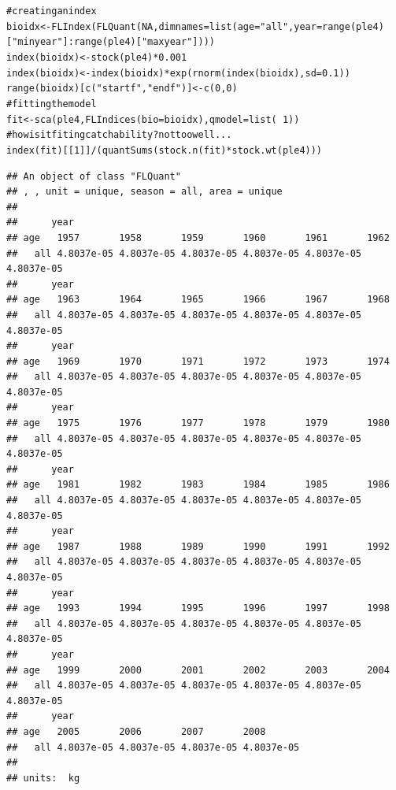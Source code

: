 \documentclass[a4paper,english,10pt]{article}\usepackage[]{graphicx}\usepackage[]{color}
\makeatletter
\newcommand{\hlnum}[1]{\textcolor[rgb]{0.2,0.2,0.2}{#1}}%
\newcommand{\hlstr}[1]{\textcolor[rgb]{0.2,0.2,0.2}{#1}}%
\newcommand{\hlcom}[1]{\textcolor[rgb]{0.2,0.267,0.4}{#1}}%
\newcommand{\hlopt}[1]{\textcolor[rgb]{0.2,0.2,0.2}{#1}}%
\newcommand{\hlstd}[1]{\textcolor[rgb]{0,0,0}{#1}}%
\newcommand{\hlkwb}[1]{\textcolor[rgb]{0.361,0.506,0.596}{#1}}%
\newcommand{\hlkwc}[1]{\textcolor[rgb]{0.361,0.506,0.596}{#1}}%
\newcommand{\hlkwd}[1]{\textcolor[rgb]{0.361,0.506,0.596}{#1}}%
\newenvironment{kframe}{%
 \def\at@end@of@kframe{}%
 \ifinner\ifhmode%
  \def\at@end@of@kframe{\end{minipage}}%
  \begin{minipage}{\columnwidth}%
 \fi\fi%
 \def\FrameCommand##1{\hskip\@totalleftmargin \hskip-\fboxsep
 \colorbox{shadecolor}{##1}\hskip-\fboxsep
     \hskip-\linewidth \hskip-\@totalleftmargin \hskip\columnwidth}%
 \MakeFramed {\advance\hsize-\width
   \@totalleftmargin\z@ \linewidth\hsize
   \@setminipage}}%
 {\par\unskip\endMakeFramed%
 \at@end@of@kframe}
\newenvironment{knitrout}{}{} %
\makeatother
\begin{document}
\begin{knitrout}
\color{fgcolor}\begin{kframe}
\begin{alltt}
\hlcom{# creating an index}
\hlstd{bioidx} \hlkwb{<-} \hlkwd{FLIndex}\hlstd{(}\hlkwd{FLQuant}\hlstd{(}\hlnum{NA}\hlstd{,} \hlkwc{dimnames} \hlstd{=} \hlkwd{list}\hlstd{(}\hlkwc{age} \hlstd{=} \hlstr{"all"}\hlstd{,} \hlkwc{year} \hlstd{=} \hlkwd{range}\hlstd{(ple4)[}\hlstr{"minyear"}\hlstd{]}\hlopt{:}\hlkwd{range}\hlstd{(ple4)[}\hlstr{"maxyear"}\hlstd{])))}
\hlkwd{index}\hlstd{(bioidx)} \hlkwb{<-} \hlkwd{stock}\hlstd{(ple4)} \hlopt{*} \hlnum{0.001}
\hlkwd{index}\hlstd{(bioidx)} \hlkwb{<-} \hlkwd{index}\hlstd{(bioidx)} \hlopt{*} \hlkwd{exp}\hlstd{(}\hlkwd{rnorm}\hlstd{(}\hlkwd{index}\hlstd{(bioidx),} \hlkwc{sd} \hlstd{=} \hlnum{0.1}\hlstd{))}
\hlkwd{range}\hlstd{(bioidx)[}\hlkwd{c}\hlstd{(}\hlstr{"startf"}\hlstd{,} \hlstr{"endf"}\hlstd{)]} \hlkwb{<-} \hlkwd{c}\hlstd{(}\hlnum{0}\hlstd{,} \hlnum{0}\hlstd{)}
\hlcom{# fitting the model}
\hlstd{fit} \hlkwb{<-} \hlkwd{sca}\hlstd{(ple4,} \hlkwd{FLIndices}\hlstd{(}\hlkwc{bio} \hlstd{= bioidx),} \hlkwc{qmodel} \hlstd{=} \hlkwd{list}\hlstd{(}\hlopt{~}\hlnum{1}\hlstd{))}
\hlcom{# how is it fiting catchability ? not too well ...}
\hlkwd{index}\hlstd{(fit)[[}\hlnum{1}\hlstd{]]}\hlopt{/}\hlstd{(}\hlkwd{quantSums}\hlstd{(}\hlkwd{stock.n}\hlstd{(fit)} \hlopt{*} \hlkwd{stock.wt}\hlstd{(ple4)))}
\end{alltt}
\begin{verbatim}
## An object of class "FLQuant"
## , , unit = unique, season = all, area = unique
## 
##      year
## age   1957       1958       1959       1960       1961       1962      
##   all 4.8037e-05 4.8037e-05 4.8037e-05 4.8037e-05 4.8037e-05 4.8037e-05
##      year
## age   1963       1964       1965       1966       1967       1968      
##   all 4.8037e-05 4.8037e-05 4.8037e-05 4.8037e-05 4.8037e-05 4.8037e-05
##      year
## age   1969       1970       1971       1972       1973       1974      
##   all 4.8037e-05 4.8037e-05 4.8037e-05 4.8037e-05 4.8037e-05 4.8037e-05
##      year
## age   1975       1976       1977       1978       1979       1980      
##   all 4.8037e-05 4.8037e-05 4.8037e-05 4.8037e-05 4.8037e-05 4.8037e-05
##      year
## age   1981       1982       1983       1984       1985       1986      
##   all 4.8037e-05 4.8037e-05 4.8037e-05 4.8037e-05 4.8037e-05 4.8037e-05
##      year
## age   1987       1988       1989       1990       1991       1992      
##   all 4.8037e-05 4.8037e-05 4.8037e-05 4.8037e-05 4.8037e-05 4.8037e-05
##      year
## age   1993       1994       1995       1996       1997       1998      
##   all 4.8037e-05 4.8037e-05 4.8037e-05 4.8037e-05 4.8037e-05 4.8037e-05
##      year
## age   1999       2000       2001       2002       2003       2004      
##   all 4.8037e-05 4.8037e-05 4.8037e-05 4.8037e-05 4.8037e-05 4.8037e-05
##      year
## age   2005       2006       2007       2008      
##   all 4.8037e-05 4.8037e-05 4.8037e-05 4.8037e-05
## 
## units:  kg
\end{verbatim}
\end{kframe}
\end{knitrout}
\end{document}

